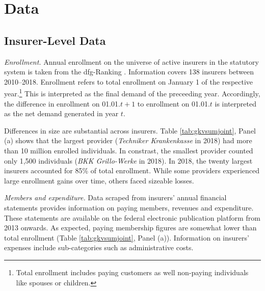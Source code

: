 \documentclass[a4paper, 11pt, english]{article}
\begin{document}
\section{Data \label{sec:data}}


\subsection{Insurer-Level Data \label{subsec:dataprovider}}

\textit{Enrollment.} Annual enrollment on the universe of active insurers in the statutory system is taken from the dfg-Ranking \citep{dfg2021}. Information covers 138 insurers between 2010--2018. Enrollment refers to total enrollment on January 1 of the respective year.\footnote{Total enrollment includes paying customers as well non-paying individuals like spouses or children.} This is interpreted as the final demand of the preceeding year. Accordingly, the difference in enrollment on 01.01.$t+1$ to enrollment on 01.01.$t$ is interpreted as the net demand generated in year $t$.

Differences in size are substantial across insurers. Table \ref{tab:gkvsumjoint}, Panel (a) shows that the largest provider (\textit{Techniker Krankenkasse} in 2018) had more than 10 million enrolled individuals. In constrast, the smallest provider counted only 1,500 individuals (\textit{BKK Grillo-Werke} in 2018). In 2018, the twenty largest insurers accounted for 85\% of total enrollment.  While some providers experienced large enrollment gains over time, others faced sizeable losses.%

\textit{Members and expenditure.} Data scraped from insurers' annual financial statements provides information on paying members, revenues and expenditure. These statements are available on the federal electronic publication platform from 2013 onwards. As expected, paying membership figures are somewhat lower than total enrollment (Table \ref{tab:gkvsumjoint}, Panel (a)). Information on insurers' expenses include sub-categories such as administrative costs.
\end{document}
